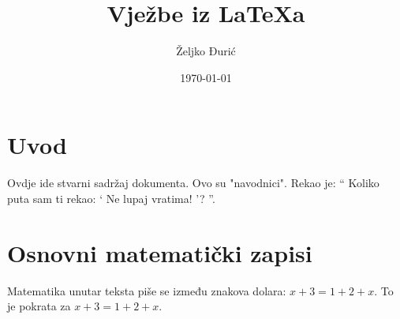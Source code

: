 \documentclass[12pt]{scrartcl}
\begin{document}
    \title{Vježbe iz \LaTeX a}
    \author{Željko Đurić}
    \date{\today}
    \maketitle
    \section{Uvod}
        Ovdje ide stvarni sadržaj dokumenta.
        Ovo su "navodnici".
        Rekao je:
        \enquote {
            Koliko puta sam ti rekao:
                \enquote {
                    Ne lupaj vratima!
                }?
        }.
    \section{Osnovni matematički zapisi}
        Matematika unutar teksta piše se između znakova dolara: $x + 3 = 1 + 2 + x$. 
        To je pokrata za \(x + 3 = 1 + 2 + x\).
\end{document}
